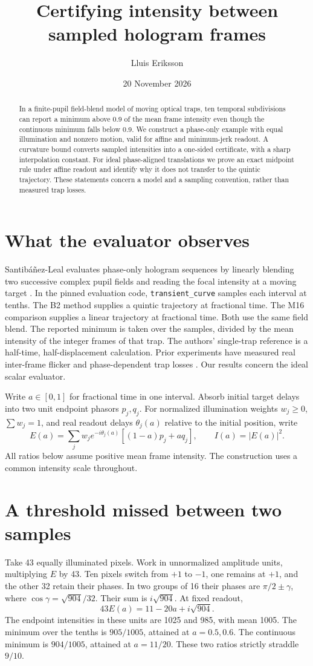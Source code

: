 \documentclass[11pt]{article}
\title{Certifying intensity between sampled hologram frames}
\author{Lluis Eriksson}\date{20 November 2026}
\begin{document}
\maketitle
\begin{abstract}
In a finite-pupil field-blend model of moving optical traps, ten temporal subdivisions can report a minimum above 0.9 of the mean frame intensity even though the continuous minimum falls below 0.9. We construct a phase-only example with equal illumination and nonzero motion, valid for affine and minimum-jerk readout. A curvature bound converts sampled intensities into a one-sided certificate, with a sharp interpolation constant. For ideal phase-aligned translations we prove an exact midpoint rule under affine readout and identify why it does not transfer to the quintic trajectory. These statements concern a model and a sampling convention, rather than measured trap losses.
\end{abstract}
\section{What the evaluator observes}
Santib\'a\~nez-Leal evaluates phase-only hologram sequences by linearly blending two successive complex pupil fields and reading the focal intensity at a moving target \cite{source}. In the pinned evaluation code, \texttt{transient\_curve} samples each interval at tenths. The B2 method supplies a quintic trajectory at fractional time. The M16 comparison supplies a linear trajectory at fractional time. Both use the same field blend. The reported minimum is taken over the samples, divided by the mean intensity of the integer frames of that trap. The authors' single-trap reference is a half-time, half-displacement calculation. Prior experiments have measured real inter-frame flicker and phase-dependent trap losses \cite{kim,knott}. Our results concern the ideal scalar evaluator.
    
Write $a\in[0,1]$ for fractional time in one interval. Absorb initial target delays into two unit endpoint phasors $p_j,q_j$. For normalized illumination weights $w_j\ge0$, $\sum w_j=1$, and real readout delays $\theta_j(a)$ relative to the initial position, write
\[
 E(a)=\sum_jw_j e^{-i\theta_j(a)}[(1-a)p_j+a q_j],\qquad I(a)=|E(a)|^2 .
\]
All ratios below assume positive mean frame intensity. The construction uses a common intensity scale throughout.

\section{A threshold missed between two samples}
Take 43 equally illuminated pixels. Work in unnormalized amplitude units, multiplying $E$ by 43. Ten pixels switch from $+1$ to $-1$, one remains at $+1$, and the other 32 retain their phases. In two groups of 16 their phases are $\pi/2\pm\gamma$, where $\cos\gamma=\sqrt{904}/32$. Their sum is $i\sqrt{904}$. At fixed readout,
\[
 43E(a)=11-20a+i\sqrt{904}.
\]
The endpoint intensities in these units are 1025 and 985, with mean 1005. The minimum over the tenths is $905/1005$, attained at $a=0.5,0.6$. The continuous minimum is $904/1005$, attained at $a=11/20$. These two ratios strictly straddle $9/10$.
\end{document}
